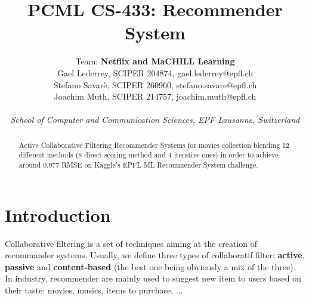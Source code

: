 \documentclass[10pt,conference,compsocconf]{IEEEtran}
\begin{document}
\title{PCML CS-433: Recommender System}

\author{
  Team: {\bf Netflix and MaCHILL Learning} \\
  Gael Lederrey, SCIPER 204874, gael.lederrey@epfl.ch \\
  Stefano Savar\`e, SCIPER 260960, stefano.savare@epfl.ch \\
  Joachim Muth, SCIPER 214757, joachim.muth@epfl.ch\\ \\
  \textit{School of Computer and Communication Sciences, EPF Lausanne, Switzerland}
}

\maketitle

\begin{abstract}
Active Collaborative Filtering Recommender Systems for movies collection blending 12 different methods (8 direct scoring method and 4 iterative ones) in order to achieve around 0.977 RMSE on Kaggle's EPFL ML Recommender System challenge. 
\end{abstract}

\section{Introduction}

Collaborative filtering is a set of techniques aiming at the creation of recommander systems. Usually, we define three types of collaboratif filter: \textbf{active}, \textbf{passive} and \textbf{content-based} (the best one being obviously a mix of the three). In industry, recommender are mainly used to suggest new item to users based on their taste: movies, musics, items to purchase, ...
\end{document}
